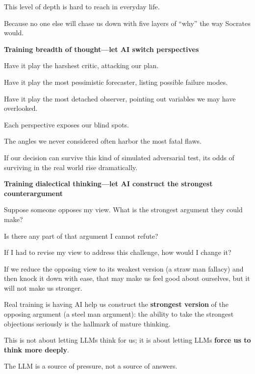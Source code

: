 This level of depth is hard to reach in everyday life.

\newpage
Because no one else will chase us down with five layers of ``why'' the way Socrates would.

\vspace{1em}

\textbf{Training breadth of thought---let AI switch perspectives}

\begin{myquote}
Have it play the harshest critic, attacking our plan.

Have it play the most pessimistic forecaster, listing possible failure modes.

Have it play the most detached observer, pointing out variables we may have overlooked.
\end{myquote}

Each perspective exposes our blind spots.

The angles we never considered often harbor the most fatal flaws.

If our decision can survive this kind of simulated adversarial test, its odds of surviving in the real world rise dramatically.

\vspace{1em}

\textbf{Training dialectical thinking---let AI construct the strongest counterargument}

\begin{myquote}
Suppose someone opposes my view. What is the strongest argument they could make?

Is there any part of that argument I cannot refute?

If I had to revise my view to address this challenge, how would I change it?
\end{myquote}
If we reduce the opposing view to its weakest version (a straw man fallacy) and then knock it down with ease, that may make us feel good about ourselves, but it will not make us stronger.

Real training is having AI help us construct the \textbf{strongest version} of the opposing argument (a steel man argument): the ability to take the strongest objections seriously is the hallmark of mature thinking.

This is not about letting LLMs think for us; it is about letting LLMs \textbf{force us to think more deeply}.

The LLM is a source of pressure, not a source of answers.


